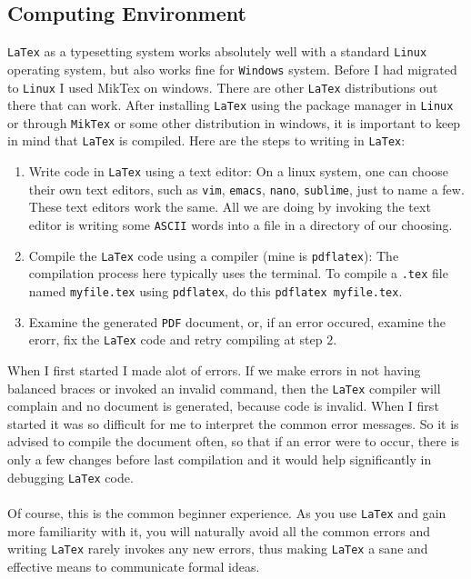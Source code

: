 \documentclass[a4paper, 12pt]{report}
\begin{document}
\begin{center}
\subsection{Computing Environment}
\begin{comment}
\end{comment}
\texttt{LaTex} as a typesetting system works absolutely well with a standard \texttt{Linux} operating system, but also works fine for \texttt{Windows} system. Before I had migrated to \texttt{Linux} I used MikTex on windows. There are other \texttt{LaTex} distributions out there that can work. After installing \texttt{LaTex} using the package manager in \texttt{Linux} or through \texttt{MikTex} or some other distribution in windows, it is important to keep in mind that \texttt{LaTex} is compiled. Here are the steps to writing in \texttt{LaTex}:
\begin{enumerate}
\item Write code in \texttt{LaTex} using a text editor: On a linux system, one can choose their own text editors, such as \texttt{vim}, \texttt{emacs}, \texttt{nano}, \texttt{sublime}, just to name a few. These text editors work the same. All we are doing by invoking the text editor is writing some \texttt{ASCII} words into a file in a directory of our choosing.
\item Compile the \texttt{LaTex} code using a compiler (mine is \texttt{pdflatex}): The compilation process here typically uses the terminal. To compile a \texttt{.tex} file named \texttt{myfile.tex} using \texttt{pdflatex}, do this \texttt{pdflatex myfile.tex}.
\item Examine the generated \texttt{PDF} document, or, if an error occured, examine the erorr, fix the \texttt{LaTex} code and retry compiling at step $2$.
\end{enumerate}
When I first started I made alot of errors. If we make errors in not having balanced braces or invoked an invalid command, then the \texttt{LaTex} compiler will complain and no document is generated, because code is invalid. When I first started it was so difficult for me to interpret the common error messages. So it is advised to compile the document often, so that if an error were to occur, there is only a few changes before last compilation and it would help significantly in debugging \texttt{LaTex} code.
\\~\\Of course, this is the common beginner experience. As you use \texttt{LaTex} and gain more familiarity with it, you will naturally avoid all the common errors and writing \texttt{LaTex} rarely invokes any new errors, thus making \texttt{LaTex} a sane and effective means to communicate formal ideas.


\end{center}
\end{document}
